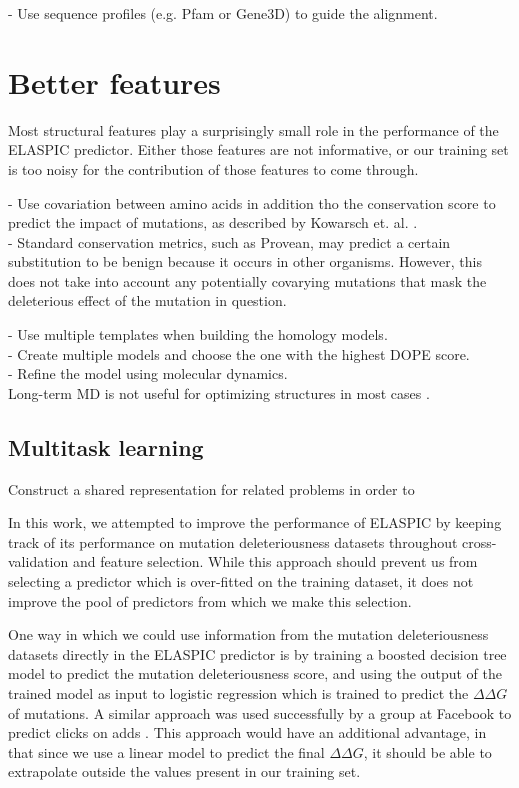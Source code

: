 - Use sequence profiles (e.g. Pfam or Gene3D) to guide the alignment.


\section{Better features}

Most structural features play a surprisingly small role in the performance of the ELASPIC predictor. Either those features are not informative, or our training set is too noisy for the contribution of those features to come through.



- Use covariation between amino acids in addition tho the conservation score to predict the impact of mutations, as described by Kowarsch et. al. \cite{kowarsch_correlated_2010}. \\
- Standard conservation metrics, such as Provean, may predict a certain substitution to be benign because it occurs in other organisms. However, this does not take into account any potentially covarying mutations that mask the deleterious effect of the mutation in question.



- Use multiple templates when building the homology models. \\
- Create multiple models and choose the one with the highest DOPE score. \\
- Refine the model using molecular dynamics. \\

Long-term MD is not useful for optimizing structures in most cases \cite{raval_refinement_2012}.

\subsection{Multitask learning}

Construct a shared representation for related problems in order to

In this work, we attempted to improve the performance of ELASPIC by keeping track of its performance on mutation deleteriousness datasets throughout cross-validation and feature selection. While this approach should prevent us from selecting a predictor which is over-fitted on the training dataset, it does not improve the pool of predictors from which we make this selection.

One way in which we could use information from the mutation deleteriousness datasets directly in the ELASPIC predictor is by training a boosted decision tree model to predict the mutation deleteriousness score, and using the output of the trained model as input to logistic regression which is trained to predict the $\Delta \Delta G$ of mutations. A similar approach was used successfully by a group at Facebook to predict clicks on adds \cite{he_practical_2014}. This approach would have an additional advantage, in that since we use a linear model to predict the final $\Delta \Delta G$, it should be able to extrapolate outside the values present in our training set.

